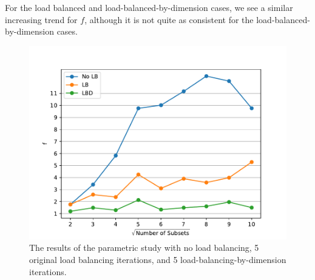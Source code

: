 \documentclass[times,final]{elsarticle}
\begin{document}
For the load balanced and load-balanced-by-dimension cases, we see a similar increasing trend for $f$, although it is not quite as consistent for the load-balanced-by-dimension cases.
\begin{figure}[H]
\centering
\includegraphics[scale=0.7]{../figures/metric_study.pdf}
\caption{The results of the parametric study with no load balancing, 5 original load balancing iterations, and 5 load-balancing-by-dimension iterations.}
\label{metric_study}
\end{figure}
\begin{table}[H]
\centering
\caption{The tabulated results of the parametric study shown in Fig.~\ref{metric_study} with no load balancing, 5 original load balancing iterations (LB), and 5 load-balancing-by-dimension (LBD) iterations.}
\label{metric_study_table}
\end{table}
\end{document}
